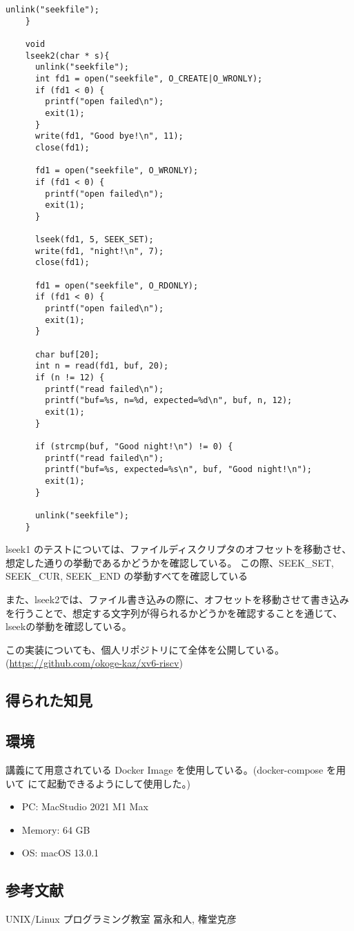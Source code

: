 \documentclass[platex,dvipdfmx, titlepage]{jlreq} %
\begin{document}
\begin{lstlisting}[caption={user/usertests.c}]
      unlink("seekfile");
    }
    
    void
    lseek2(char * s){
      unlink("seekfile");
      int fd1 = open("seekfile", O_CREATE|O_WRONLY);
      if (fd1 < 0) {
        printf("open failed\n");
        exit(1);
      }
      write(fd1, "Good bye!\n", 11);
      close(fd1);
    
      fd1 = open("seekfile", O_WRONLY);
      if (fd1 < 0) {
        printf("open failed\n");
        exit(1);
      }
    
      lseek(fd1, 5, SEEK_SET);
      write(fd1, "night!\n", 7);
      close(fd1);
    
      fd1 = open("seekfile", O_RDONLY);
      if (fd1 < 0) {
        printf("open failed\n");
        exit(1);
      }
    
      char buf[20];
      int n = read(fd1, buf, 20);
      if (n != 12) {
        printf("read failed\n");
        printf("buf=%s, n=%d, expected=%d\n", buf, n, 12);
        exit(1);
      }
    
      if (strcmp(buf, "Good night!\n") != 0) {
        printf("read failed\n");
        printf("buf=%s, expected=%s\n", buf, "Good night!\n");
        exit(1);
      }
    
      unlink("seekfile");
    }
\end{lstlisting}

lseek1 のテストについては、ファイルディスクリプタのオフセットを移動させ、想定した通りの挙動であるかどうかを確認している。
この際、SEEK\_SET, SEEK\_CUR, SEEK\_END の挙動すべてを確認している

また、lseek2では、ファイル書き込みの際に、オフセットを移動させて書き込みを行うことで、想定する文字列が得られるかどうかを確認することを通じて、lseekの挙動を確認している。

この実装についても、個人リポジトリにて全体を公開している。(\url{https://github.com/okoge-kaz/xv6-riscv})

\subsection{得られた知見}



\subsection{環境}

講義にて用意されている Docker Image を使用している。(docker-compose を用いて にて起動できるようにして使用した。)

\begin{itemize}
    \item PC: MacStudio 2021 M1 Max
    \item Memory: 64 GB
    \item OS: macOS 13.0.1
\end{itemize}

\subsection{参考文献}

UNIX/Linux プログラミング教室 冨永和人, 権堂克彦
\end{document}
